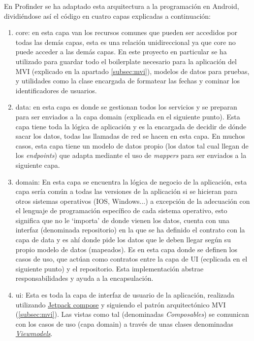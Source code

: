 En Profinder se ha adaptado esta arquitectura a la programación en Android, dividiéndose así el código en cuatro capas explicadas a continuación:
\begin{enumerate}
    \item core: en esta capa van los recursos comunes que pueden ser accedidos por todas las demás capas, esta es una relación unidireccional ya que core no puede acceder a las demás capas. En este proyecto en particular se ha utilizado para guardar todo el boilerplate necesario para la aplicación del MVI (explicado en la apartado \ref{subsec:mvi}), modelos de datos para pruebas, y utilidades como la clase encargada de formatear las fechas y cominar los identificadores de usuarios.
    \item data: en esta capa es donde se gestionan todos los servicios y se preparan para ser enviados a la capa domain (explicada en el siguiente punto). Esta capa tiene toda la lógica de aplicación y es la encargada de decidir de dónde sacar los datos, todas las llamadas de red se hacen en esta capa. En muchos casos, esta capa tiene un modelo de datos propio (los datos tal cual llegan de los \textit{endpoints}) que adapta mediante el uso de \textit{mappers} para ser enviados a la siguiente capa.
    \item domain: En esta capa se encuentra la lógica de negocio de la aplicación, esta capa sería común a todas las versiones de la aplicación si se hicieran para otros sistemas operativos (IOS, Windows...) a excepción de la adecuación con el lenguaje de programación específico de cada sistema operativo, esto significa que no le ‘importa’ de donde vienen los datos, cuenta con una interfaz (denominada repositorio) en la que se ha definido el contrato con la capa de data y es ahí donde pide los datos que le deben llegar según su propio modelo de datos (mapeados). Es en esta capa donde se definen los casos de uso, que actúan como contratos entre la capa de UI (ecplicada en el siguiente punto) y el repositorio. Esta implementación abstrae responsabilidades y ayuda a la encapsulación. 
    \item ui: Esta es toda la capa de interfaz de usuario de la aplicación, realizada utilizando \hyperlink{subsec:compose}{Jetpack compose} y siguiendo el patrón arquitectónico  MVI (\ref{subsec:mvi}). Las vistas como tal (denominadas \textit{Composables}) se comunican con los casos de uso (capa domain) a través de unas clases denominadas \href{https://developer.android.com/topic/libraries/architecture/viewmodel}{\textit{Viewmodels}}.

\end{enumerate}
\hypertarget{subsec:mvi}{}
